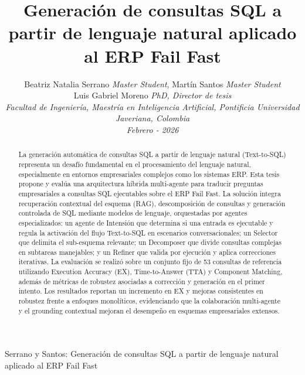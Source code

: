 \documentclass[journal]{IEEEtran}
\begin{document}
\title{Generación de consultas SQL a partir de lenguaje natural aplicado al ERP Fail Fast
}

\author{Beatriz Natalia Serrano \textit{Master Student}, Martín Santos \textit{Master Student}\\
	Luis Gabriel Moreno \textit{PhD, Director de tesis}\\[0.6em]
	\textit{Facultad de Ingeniería, Maestría en Inteligencia Artificial, Pontificia Universidad Javeriana, Colombia}\\[0.6em]
	\textit{Febrero - 2026}
}

{Serrano y Santos: Generación de consultas SQL a partir de lenguaje natural aplicado al ERP Fail Fast}

\maketitle

\begin{abstract}
	La generación automática de consultas SQL a partir de lenguaje natural (Text-to-SQL) representa un desafío fundamental en el procesamiento del lenguaje natural, especialmente en entornos empresariales complejos como los sistemas ERP. Esta tesis propone y evalúa una arquitectura híbrida multi-agente para traducir preguntas empresariales a consultas SQL ejecutables sobre el ERP Fail Fast. La solución integra recuperación contextual del esquema (RAG), descomposición de consultas y generación controlada de SQL mediante modelos de lenguaje, orquestadas por agentes especializados: un agente de Intensión que determina si una entrada es ejecutable y regula la activación del flujo Text-to-SQL en escenarios conversacionales; un Selector que delimita el sub-esquema relevante; un Decomposer que divide consultas complejas en subtareas manejables; y un Refiner que valida por ejecución y aplica correcciones iterativas. La evaluación se realizó sobre un conjunto fijo de 53 consultas de referencia utilizando Execution Accuracy (EX), Time-to-Answer (TTA) y Component Matching, además de métricas de robustez asociadas a corrección y generación en el primer intento. Los resultados reportan un incremento en EX y mejoras consistentes en robustez frente a enfoques monolíticos, evidenciando que la colaboración multi-agente y el grounding contextual mejoran el desempeño en esquemas empresariales extensos.
\end{abstract}
\end{document}
